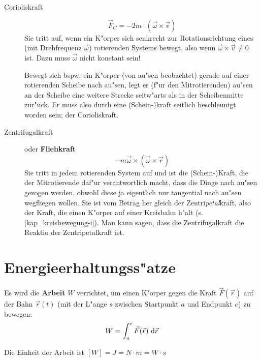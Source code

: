 \begin{description}
\item[Corioliskraft]
\begin{equation}
   \label{eqn_coriolis-kraft}
\boxed{   \Vec F_C = -2 m \cdot ( \Vec \omega \times \vec v ) }
\end{equation}
Sie tritt auf, wenn ein K"orper sich senkrecht zur Rotationsrichtung
eines (mit Drehfrequenz $\Vec \omega$) rotierenden Systems
bewegt, also wenn $\vec \omega \times \vec v \neq 0$ ist. Dazu muss
$\vec \omega$ nicht konstant sein!

Bewegt sich bspw. ein K"orper (von au"sen beobachtet) gerade auf einer
rotierenden Scheibe nach au"sen, legt er (f"ur den Mitrotierenden)
au"sen an der Scheibe eine weitere Strecke seitw"arts als in der
Scheibenmitte zur"uck. Er muss also durch eine (Schein-)kraft seitlich
beschleunigt worden sein; der Corioliskraft. 


\item[Zentrifugalkraft] oder
   \textbf{Fliehkraft}
\begin{equation}
   \label{eqn_zentrifugalkraft}
 \boxed{   -m\Vec \omega \times ( \Vec \omega \times \Vec r ) }
\end{equation}
Sie tritt in jedem rotierenden System auf und ist die (Schein-)Kraft, die
der Mitrotierende daf"ur verantwortlich macht, dass die Dinge nach
au"sen gezogen werden, obwohl diese ja eigentlich nur tangential nach
au"sen wegfliegen wollen. Sie ist vom Betrag her gleich der
Zentri\emph{petal}kraft, also der Kraft, die einen K"orper auf einer
Kreisbahn h"alt (s. \ref{kap_kreisbewegung-i}). Man kann sagen, dass
die Zentrifugalkraft die Reaktio der Zentripetalkraft ist.
\end{description}










\section{Energieerhaltungss"atze}
\label{kap_energieerhaltungssaetze}


\begin{Def}[Arbeit]
   \label{def_arbeit}
Es wird die \textbf{Arbeit} $W$ verrichtet, um einen K"orper gegen die
Kraft $\Vec F(\Vec r)$ auf der Bahn $\Vec r(t)$ (mit der L"ange $s$ zwischen
Startpunkt $a$ und Endpunkt $e$) zu
bewegen:
\begin{equation}
   \label{eqn_def_arbeit}
   W  = \int_a^e \Vec F(\Vec r) \, \, \mathrm{d} \Vec r
\end{equation}
\end{Def}
Die Einheit der Arbeit ist $[W] = J = N \cdot m = W \cdot s$


